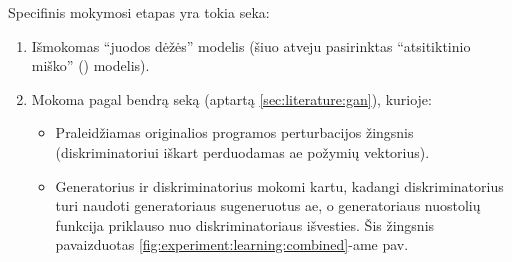 Specifinis  mokymosi etapas yra tokia seka:
\begin{enumerate}
    \item Išmokomas \enquote{juodos dėžės} modelis (šiuo atveju pasirinktas
          \enquote{atsitiktinio miško} () modelis).
    \item Mokoma pagal bendrą seką (aptartą \ref{sec:literature:gan}), kurioje:
          \begin{itemize}
              \item Praleidžiamas originalios programos perturbacijos žingsnis (diskriminatoriui
                    iškart perduodamas \acs{ae} požymių vektorius).
              \item Generatorius ir diskriminatorius mokomi kartu, kadangi diskriminatorius turi
                    naudoti generatoriaus sugeneruotus \acs{ae}, o generatoriaus nuostolių funkcija
                    priklauso nuo diskriminatoriaus išvesties. Šis žingsnis pavaizduotas
                    \ref{fig:experiment:learning:combined}-ame pav.
          \end{itemize}
\end{enumerate}

